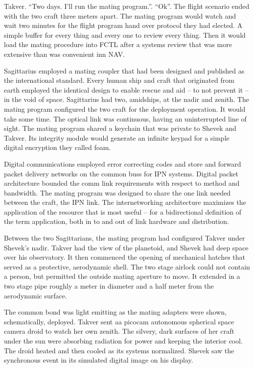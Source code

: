 Takver.  ``Two days.  I'll run the mating program.''.  ``Ok''.  The
flight scenario ended with the two craft three meters apart.  The
mating program would watch and wait two minutes for the flight program
hand over protocol they had elected.  A simple buffer for every thing
and every one to review every thing.  Then it would load the mating
procedure into FCTL after a systems review that was more extensive
than was convenient inn NAV.

Sagittarius employed a mating coupler that had been designed and
published as the international standard.  Every human ship and craft
that originated from earth employed the identical design to enable
rescue and aid -- to not prevent it -- in the void of space.
Sagittarius had two, amidships, at the nadir and zenith.  The mating
program configured the two craft for the deployment operation.  It
would take some time.  The optical link was continuous, having an
uninterrupted line of sight.  The mating program shared a keychain
that was private to Shevek and Takver.  Its integrity module would
generate an infinite keypad for a simple digital encryption they
called foam.

Digital communications employed error correcting codes and store and
forward packet delivery networks on the common buss for IPN systems.
Digital packet architecture bounded the comm link requirements with
respect to method and bandwidth.  The mating program was designed to
share the one link needed between the craft, the IPN link.  The
internetworking architecture maximizes the application of the resource
that is most useful -- for a bidirectional definition of the term
application, both in to and out of link hardware and distribution.

Between the two Sagittarians, the mating program had configured Takver
under Shevek's nadir.  Takver had the view of the planetoid, and
Shevek had deep space over his observatory.  It then commenced the
opening of mechanical hatches that served as a protective, aerodynamic
shell.  The two stage airlock could not contain a person, but
permitted the outside mating aperture to move.  It extended in a two
stage pipe roughly a meter in diameter and a half meter from the
aerodynamic surface.

The common bond was light emitting as the mating adapters were shown,
schematically, deployed.  Takver sent aa picocam autonomous spherical
space camera droid to watch her own zenith.  The silvery, dark
surfaces of her craft under the sun were absorbing radiation for power
and keeping the interior cool.  The droid heated and then cooled as
its systems normalized.  Shevek saw the synchronous event in its
simulated digital image on his display.

